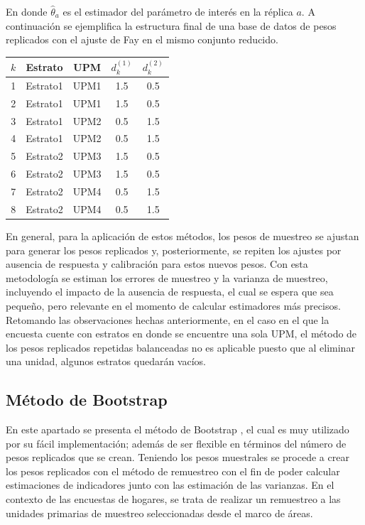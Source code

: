 \documentclass[
  12pt,
  spanish,
]{book}
\begin{document}
En donde \(\hat{\theta}_a\) es el estimador del parámetro de interés en la réplica \(a\). A continuación se ejemplifica la estructura final de una base de datos de pesos replicados con el ajuste de Fay en el mismo conjunto reducido.

\begin{longtable}[]{@{}ccccc@{}}
\toprule
\(k\) & Estrato & UPM & \(d_k^{(1)}\) & \(d_k^{(2)}\) \\
\midrule
\endhead
1 & Estrato1 & UPM1 & 1.5 & 0.5 \\
2 & Estrato1 & UPM1 & 1.5 & 0.5 \\
3 & Estrato1 & UPM2 & 0.5 & 1.5 \\
4 & Estrato1 & UPM2 & 0.5 & 1.5 \\
5 & Estrato2 & UPM3 & 1.5 & 0.5 \\
6 & Estrato2 & UPM3 & 1.5 & 0.5 \\
7 & Estrato2 & UPM4 & 0.5 & 1.5 \\
8 & Estrato2 & UPM4 & 0.5 & 1.5 \\
\bottomrule
\end{longtable}

En general, para la aplicación de estos métodos, los pesos de muestreo se ajustan para generar los pesos replicados y, posteriormente, se repiten los ajustes por ausencia de respuesta y calibración para estos nuevos pesos. Con esta metodología se estiman los errores de muestreo y la varianza de muestreo, incluyendo el impacto de la ausencia de respuesta, el cual se espera que sea pequeño, pero relevante en el momento de calcular estimadores más precisos. Retomando las observaciones hechas anteriormente, en el caso en el que la encuesta cuente con estratos en donde se encuentre una sola UPM, el método de los pesos replicados repetidas balanceadas no es aplicable puesto que al eliminar una unidad, algunos estratos quedarán vacíos.

\hypertarget{muxe9todo-de-bootstrap}{%
\subsection{Método de Bootstrap}\label{muxe9todo-de-bootstrap}}

En este apartado se presenta el método de Bootstrap \citep{EfroTibs93}, el cual es muy utilizado por su fácil implementación; además de ser flexible en términos del número de pesos replicados que se crean. Teniendo los pesos muestrales se procede a crear los pesos replicados con el método de remuestreo con el fin de poder calcular estimaciones de indicadores junto con las estimación de las varianzas. En el contexto de las encuestas de hogares, se trata de realizar un remuestreo a las unidades primarias de muestreo seleccionadas desde el marco de áreas.
\end{document}
